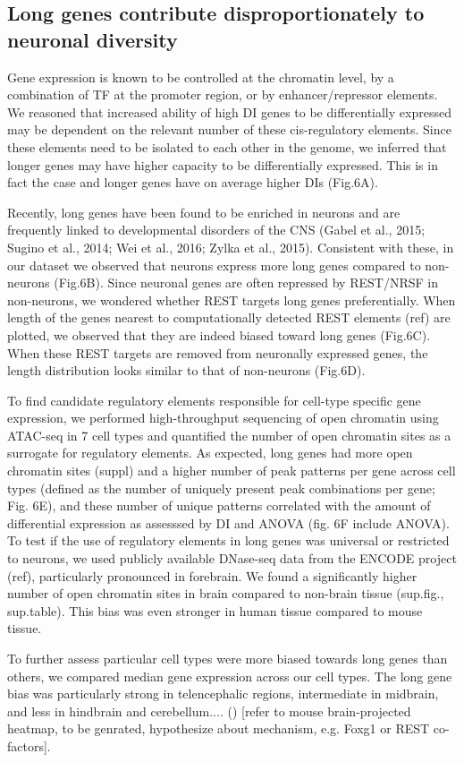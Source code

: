 \subsection{Long genes contribute disproportionately to neuronal diversity}

Gene expression is known to be controlled at the chromatin level, by a combination of TF at the promoter region, or by enhancer/repressor elements. We reasoned that increased ability of high DI genes to be differentially expressed may be dependent on the relevant number of these cis-regulatory elements. Since these elements need to be isolated to each other in the genome, we inferred that longer genes may have higher capacity to be differentially expressed. This is in fact the case and longer genes have on average higher DIs (Fig.6A).

Recently, long genes have been found to be enriched in neurons and are frequently linked to developmental disorders of the CNS (Gabel et al., 2015; Sugino et al., 2014; Wei et al., 2016; Zylka et al., 2015). Consistent with these, in our dataset we observed that neurons express more long genes compared to non-neurons (Fig.6B). Since neuronal genes are often repressed by REST/NRSF in non-neurons, we wondered whether REST targets long genes preferentially. When length of the genes nearest to computationally detected REST elements (ref) are plotted, we observed that they are indeed biased toward long genes (Fig.6C). When these REST targets are removed from neuronally expressed genes, the length distribution looks similar to that of non-neurons (Fig.6D).

To find candidate regulatory elements responsible for cell-type specific gene expression, we performed high-throughput sequencing of open chromatin using ATAC-seq in 7 cell types and quantified the number of open chromatin sites as a surrogate for regulatory elements. As expected, long genes had more open chromatin sites (suppl) and a higher number of peak patterns per gene across cell types (defined as the number of uniquely present peak combinations per gene;  Fig. 6E), and these number of unique patterns correlated with the amount of differential expression as assesssed by DI and ANOVA (fig. 6F include ANOVA).
To test if the use of regulatory elements in long genes was universal or restricted to neurons, we used publicly available DNase-seq data from the ENCODE project (ref), particularly pronounced in forebrain. We found a significantly higher number of open chromatin sites in brain compared to non-brain tissue (sup.fig., sup.table). This bias was even stronger in human tissue compared to mouse tissue.

To further assess particular cell types were more biased towards long genes than others, we compared median gene expression across our cell types. The long gene bias was particularly strong in telencephalic regions, intermediate in midbrain, and less in hindbrain and cerebellum.... () [refer to mouse brain-projected heatmap, to be genrated, hypothesize about mechanism, e.g. Foxg1 or REST co-factors].